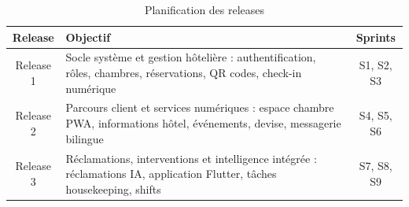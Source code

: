 \begin{table}[H]
\centering
\caption{Planification des releases}
\begin{tabularx}{\textwidth}{|c|X|c|}
\hline
\textbf{Release} & \textbf{Objectif} & \textbf{Sprints} \\ \hline
Release 1 & Socle système et gestion hôtelière : authentification, rôles, chambres, réservations, QR codes, check-in numérique & S1, S2, S3 \\ \hline
Release 2 & Parcours client et services numériques : espace chambre PWA, informations hôtel, événements, devise, messagerie bilingue & S4, S5, S6 \\ \hline
Release 3 & Réclamations, interventions et intelligence intégrée : réclamations IA, application Flutter, tâches housekeeping, shifts & S7, S8, S9 \\ \hline
\end{tabularx}
\label{tab:planification_releases}
\end{table}
\FloatBarrier
